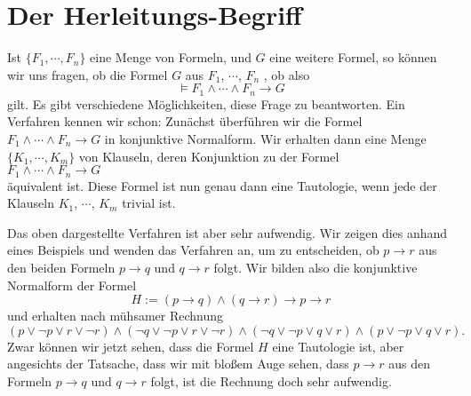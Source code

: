 \section{Der Herleitungs-Begriff}
Ist $\{F_1,\cdots,F_n\}$ eine Menge von Formeln, und $G$ eine weitere Formel, so
können wir uns fragen, ob  die  Formel $G$ aus $F_1$, $\cdots$, $F_n$ , ob
also 
\[ \models F_1 \wedge \cdots \wedge F_n \rightarrow G \]
gilt.
Es gibt verschiedene Möglichkeiten, diese Frage zu beantworten.  Ein Verfahren kennen wir
schon: Zunächst überführen wir die Formel  $F_1 \wedge \cdots \wedge F_n \rightarrow G$ in
konjunktive Normalform.  Wir erhalten dann eine Menge
$\{K_1,\cdots,K_m\}$ von Klauseln, deren Konjunktion zu der  Formel
\\[0.2cm]
\hspace*{1.3cm} $F_1 \wedge \cdots \wedge F_n \rightarrow G$
\\[0.2cm] 
äquivalent ist.  Diese Formel ist nun genau dann eine Tautologie, wenn
jede der Klauseln $K_1$, $\cdots$, $K_m$ trivial ist.  

Das oben dargestellte Verfahren ist aber sehr aufwendig.  Wir zeigen dies anhand eines
Beispiels und wenden das Verfahren
an, um zu entscheiden, ob $p \rightarrow r$ aus den beiden Formeln $p \rightarrow q$ und
$q \rightarrow r$ folgt.   Wir bilden also die konjunktive Normalform der Formel 
\[ H := (p \rightarrow q) \wedge (q \rightarrow r) \rightarrow p \rightarrow r
\]
und erhalten nach mühsamer Rechnung
\[
   (p \vee \neg p \vee r \vee \neg r) \wedge (\neg q \vee \neg p \vee r \vee \neg r) \wedge
   (\neg q \vee \neg p \vee q \vee r) \wedge (p \vee \neg p \vee q \vee r). 
\]
Zwar können wir jetzt sehen, dass die Formel $H$ eine Tautologie ist, aber angesichts der
Tatsache, dass wir mit bloßem Auge sehen, dass  $p \rightarrow r$ aus den Formeln $p \rightarrow q$ und
$q \rightarrow r$ folgt, ist die Rechnung  doch  sehr aufwendig.

